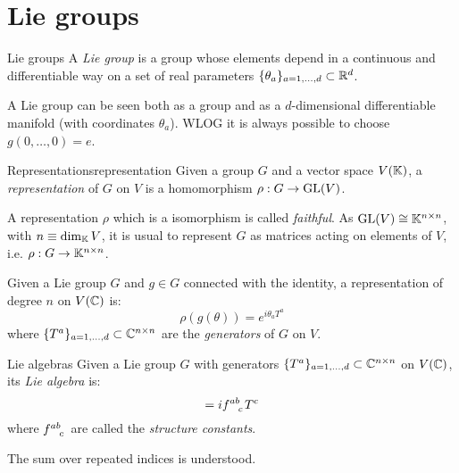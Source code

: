 
\section{Lie groups}

\begin{definition}{Lie groups}{}
  A \textit{Lie group} is a group whose elements depend in a continuous and differentiable way on a set of real parameters $ \{\theta_a\}_{a = 1, \dots, d} \subset \mathbb{R}^d $.
\end{definition}

A Lie group can be seen both as a group and as a $ d $-dimensional differentiable manifold (with coordinates $ \theta_a $). WLOG it is always possible to choose $ g(0,\dots,0) = e $.

\begin{definition}{Representations}{representation}
  Given a group $ G $ and a vector space $ V(\mathbb{K}) $, a \textit{representation} of $ G $ on $ V $ is a homomorphism $ \rho : G \rightarrow \mathrm{GL}(V) $.
\end{definition}

A representation $ \rho $ which is a isomorphism is called \textit{faithful}. As $ \mathrm{GL}(V) \cong \mathbb{K}^{n \times n} $, with $ n \equiv \dim_{\mathbb{K}} V $, it is usual to represent $ G $ as matrices acting on elements of $ V $, i.e. $ \rho : G \rightarrow \mathbb{K}^{n \times n} $.

\begin{theorem}{}{}
  Given a Lie group $ G $ and $ g \in G $ connected with the identity, a representation of degree $ n $ on $ V(\mathbb{C}) $ is:
  \begin{equation}
    \rho(g(\theta)) = e^{i \theta_a T^a}
  \end{equation}
  where $ \{T^a\}_{a = 1, \dots, d} \subset \mathbb{C}^{n \times n} $ are the \textit{generators} of $ G $ on $ V $.
\end{theorem}

\begin{definition}{Lie algebras}{}
  Given a Lie group $ G $ with generators $ \{T^a\}_{a = 1, \dots, d} \subset \mathbb{C}^{n \times n} $ on $ V(\mathbb{C}) $, its \textit{Lie algebra} is:
  \begin{equation}
    [T^a, T^b] = i \tensor{f}{^a^b_c} T^c
  \end{equation}
  where $ \tensor{f}{^a^b_c} $ are called the \textit{structure constants}.
\end{definition}

The sum over repeated indices is understood.

